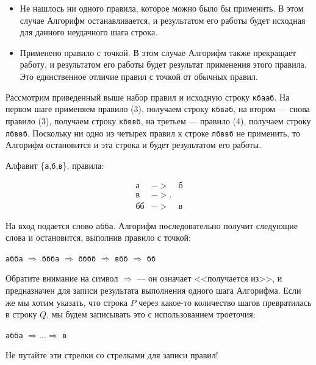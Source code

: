 \documentclass[12pt,a4paper,oneside]{article}
\newcommand{\s}[1]{\texttt{#1}}
\begin{document}
\begin{itemize}
\item
Не нашлось ни одного правила, которое можно было бы применить.
В этом случае Алгорифм останавливается, и результатом его работы будет
исходная для данного неудачного шага строка. 

\item
Применено правило с точкой. В этом случае Алгорифм также прекращает работу,
и результатом его работы будет результат применения этого правила.
Это единственное отличие правил с точкой от обычных правил.
\end{itemize}

\begin{example} Рассмотрим приведенный выше набор правил и исходную
строку \s{кбааб}. На первом шаге применяем правило (3),
получаем строку \s{кбваб}, на втором --- снова правило (3), получаем строку
\s{кбввб}, на третьем --- правило (4), получаем строку \s{лбввб}. 
Поскольку ни одно из четырех правил к строке \s{лбввб} не применить,
то Алгорифм остановится и эта строка и будет результатом его работы.
\end{example}

\begin{example} Алфавит \{\s{а},\s{б},\s{в}\}, правила:
\begin{bnf}\begin{eqnarray*}
   \s{а}&->&\s{б}\\
   \s{в}&->.&\\
   \s{бб}&->&\s{в}
\end{eqnarray*}\end{bnf}  

   На вход подается слово \s{абба}. Алгорифм последовательно получит 
   следующие слова и остановится, выполнив правило с точкой:
\begin{center}\s{абба} $\Rightarrow$ 
   \s{ббба} $\Rightarrow$ 
   \s{бббб} $\Rightarrow$ 
   \s{вбб}  $\Rightarrow$ 
   \s{бб}\end{center}
\end{example}

Обратите внимание на символ $\Rightarrow$ --- он означает <<получается из>>,
и предназначен для записи результата выполнения одного шага Алгорифма. 
Если же мы хотим указать, что строка $P$ через какое-то количество
шагов превратилась в строку $Q$, мы будем записывать это
с использованием троеточия:
\begin{center}\s{абба} $\Rightarrow\dots\Rightarrow$ \s{в}\end{center}
Не путайте эти стрелки со стрелками для записи правил! 
\end{document}
